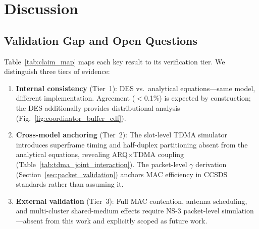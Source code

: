 \documentclass[journal]{IEEEtran}
\begin{document}
\section{Discussion}

\subsection{Validation Gap and Open Questions}
\label{sec:validation_gap}

Table~\ref{tab:claim_map} maps each key result to its verification tier. We distinguish three tiers of evidence:
\begin{enumerate}
    \item \textbf{Internal consistency} (Tier~1): DES vs.\ analytical equations---same model, different implementation. Agreement ($<$0.1\%) is expected by construction; the DES additionally provides distributional analysis (Fig.~\ref{fig:coordinator_buffer_cdf}).
    \item \textbf{Cross-model anchoring} (Tier~2): The slot-level TDMA simulator introduces superframe timing and half-duplex partitioning absent from the analytical equations, revealing ARQ$\times$TDMA coupling (Table~\ref{tab:tdma_joint_interaction}). The packet-level $\gamma$ derivation (Section~\ref{sec:packet_validation}) anchors MAC efficiency in CCSDS standards rather than assuming it.
    \item \textbf{External validation} (Tier~3): Full MAC contention, antenna scheduling, and multi-cluster shared-medium effects require NS-3 packet-level simulation---absent from this work and explicitly scoped as future work.
\end{enumerate}
\end{document}
